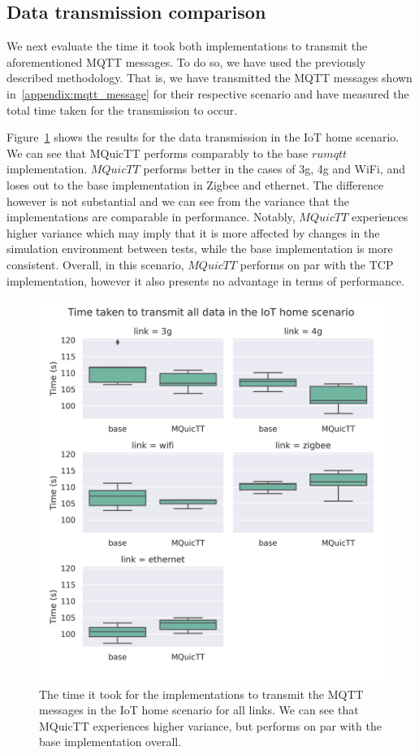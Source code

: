 \subsection{Data transmission comparison}

We next evaluate the time it took both implementations to transmit the aforementioned MQTT messages.
To do so, we have used the previously described methodology.
That is, we have transmitted the MQTT messages shown in~\ref{appendix:mqtt_message} for their respective scenario and have measured the total time taken for the transmission to occur.

Figure~\ref{fig:comm_time_home} shows the results for the data transmission in the IoT home scenario.
We can see that MQuicTT performs comparably to the base $rumqtt$ implementation.
$MQuicTT$ performs better in the cases of 3g, 4g and WiFi, and loses out to the base implementation in Zigbee and ethernet.
The difference however is not substantial and we can see from the variance that the implementations are comparable in performance.
Notably, $MQuicTT$ experiences higher variance which may imply that it is more affected by changes in the simulation environment between tests, while the base implementation is more consistent.
Overall, in this scenario, $MQuicTT$ performs on par with the TCP implementation, however it also presents no advantage in terms of performance.

\begin{figure}
    \centering
    \includegraphics[width=1\linewidth]{images/analysis_comm_time_home.png}
    \caption{The time it took for the implementations to transmit the MQTT messages in the IoT home scenario for all links.
        We can see that MQuicTT experiences higher variance, but performs on par with the base implementation overall.}
    \label{fig:comm_time_home}
\end{figure}

